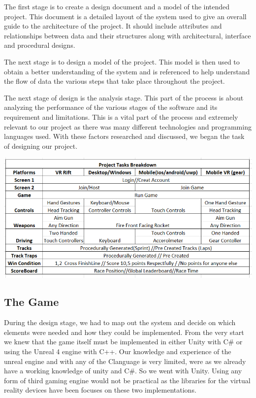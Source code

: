 The first stage is to create a design document and a model of the intended project. This document is a detailed layout of the system used to give an overall guide to the architecture of the project.
It should include attributes and relationships between data and their structures along with architectural, interface and procedural designs.
\newline

The next stage is to design a model of the project. This model is then used to obtain a better understanding of the system and is referenced to help understand the flow of data the various steps that take place throughout the project. 
\cite {36160220110101}


The next stage of design is the analysis stage. This part of the process is about analyzing the performance of the various stages of the software and its requirement and limitations. This is a vital part of the process and extremely relevant to our project as there was many different technologies and programming languages used. With these factors researched and discussed, we began the task of designing our project.
\newline

\includegraphics[width=1\columnwidth]{img/breakdown.PNG}

\subsection {The Game}
During the design stage, we had to map out the system and decide on which elements were needed and how they could be implemented. From the very start we knew that the game itself must be implemented in either Unity with C\# or using the Unreal 4 engine with C++. Our knowledge and experience of the unreal engine and with any of the C\p\p language is very limited, were as we already have a working knowledge of unity and C\#. So we went with Unity. Using any form of third gaming engine would not be practical as the libraries for the virtual reality devices have been focuses on these two implementations.\newline

